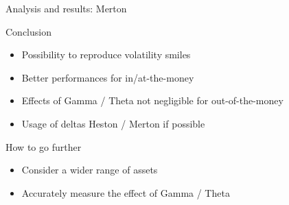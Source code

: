 \documentclass{beamer}
\newcommand{\BSM}{Black--Scholes--Merton }
\begin{document}
\begin{frame}{Analysis and results: Merton}

    \begin{figure}[h]
      \centering
      
    \end{figure}
 
\end{frame}


\begin{frame}{Conclusion}
  
  \begin{itemize}
    \item Possibility to reproduce volatility smiles
    \item Better performances for in/at-the-money
    \item Effects of Gamma / Theta not negligible for out-of-the-money
    \item Usage of deltas Heston / Merton if possible
  \end{itemize} 

  \begin{block}{How to go further}
  \begin{itemize}
    \item Consider a wider range of assets
    \item Accurately measure the effect of Gamma / Theta
  \end{itemize} 
  \end{block}
  
\end{frame}



 
\end{document}
